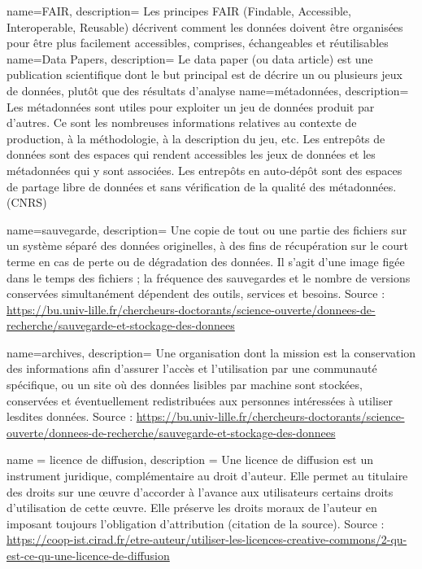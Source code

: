 {
    name=FAIR,
    description={
                Les principes FAIR (Findable, Accessible, Interoperable, Reusable) décrivent comment les données doivent être organisées pour être plus facilement accessibles, comprises, échangeables et réutilisables
                }
}
{
    name=Data Papers,
    description={
    Le data paper (ou data article) est une publication scientifique dont le but principal est de décrire un ou plusieurs jeux de données, plutôt que des résultats d'analyse
    }
}
{
    name=métadonnées,
    description={
    Les métadonnées sont utiles pour exploiter un jeu de
données produit par d'autres. Ce sont les nombreuses
informations relatives au contexte de production, à la
méthodologie, à la description du jeu, etc.
Les entrepôts de données sont des espaces qui rendent
accessibles les jeux de données et les métadonnées qui
y sont associées.
Les entrepôts en auto-dépôt sont des espaces de
partage libre de données et sans vérification de la
qualité des métadonnées. (CNRS)
    }
}

{
    name=sauvegarde,
    description={
    Une copie de tout ou une partie des fichiers sur un système séparé des données originelles, à des fins de récupération sur le court terme en cas de perte ou de dégradation des données. Il s’agit d’une image figée dans le temps des fichiers ; la fréquence des sauvegardes et le nombre de versions conservées simultanément dépendent des outils, services et besoins.
    Source : \url{https://bu.univ-lille.fr/chercheurs-doctorants/science-ouverte/donnees-de-recherche/sauvegarde-et-stockage-des-donnees}
    }
}

{
    name=archives,
    description={
    Une organisation dont la mission est la conservation des informations afin d’assurer l’accès et l’utilisation par une communauté spécifique, ou un site où des données lisibles par machine sont stockées, conservées et éventuellement redistribuées aux personnes intéressées à utiliser lesdites données.
    Source : \url{https://bu.univ-lille.fr/chercheurs-doctorants/science-ouverte/donnees-de-recherche/sauvegarde-et-stockage-des-donnees}
    }
}

{
    name = licence de diffusion,
    description ={
    Une licence de diffusion est un instrument juridique, complémentaire au droit d’auteur. Elle permet au titulaire des droits sur une œuvre d’accorder à l’avance aux utilisateurs certains droits d’utilisation de cette œuvre. Elle préserve les droits moraux de l’auteur en imposant toujours l’obligation d’attribution (citation de la source).
    Source : \url{https://coop-ist.cirad.fr/etre-auteur/utiliser-les-licences-creative-commons/2-qu-est-ce-qu-une-licence-de-diffusion}
    }
}

